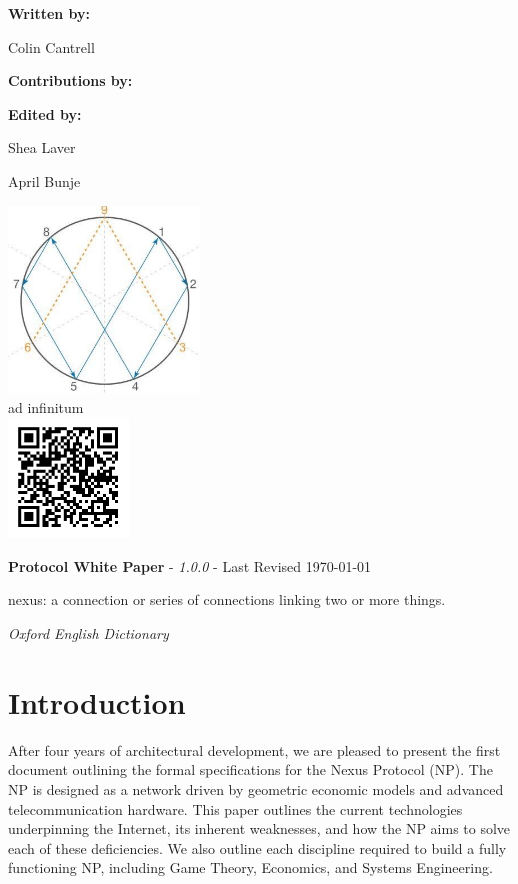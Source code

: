 \documentclass[11pt]{article}
\newcommand{\maketitlepage}[3]{
  \begingroup
  \centering
   
  \vspace*{2\baselineskip}
  
  \textbf{Written by:}\par
  \medskip
  Colin Cantrell\par

  \vspace*{2\baselineskip}

  \textbf{Contributions by:}\par\medskip
  \renewcommand\do[1]{%
    {
    \usevalue ##1:firstname \space \usevalue ##1:lastname \par}%
    }
  \docsvlist{#1}
  
  \vspace*{1.5\baselineskip}
  
  \textbf{Edited by:}\par
  Shea Laver \par
  April Bunje
  
  
  \vspace*{2\baselineskip}
  \includegraphics[width=0.38\textwidth]{./images/rsz_logo.png} \\
  \medskip
  ad infinitum \\
  
  \vspace*{1\baselineskip}
  \includegraphics[width=0.24\textwidth]{./images/rsz_npqr.png} \\
  \vspace*{3\baselineskip}
 

\pagebreak
\endgroup
}
\begin{document}
\title{\rmfamily{}}

\date {\usvardate {}}
\maketitle
\begin{abstract}
\bigskip


\noindent The Internet is one of the most important modern-day technologies, based on the Open Systems Interconnection (OSI) model with which there remains unresolved architectural limitations despite continued improvements.
Within this document, we outline a new architecture for the Internet that combines micro-satellites, phased array antennas, and software-defined routing to achieve a new degree of security and accessibility otherwise unobtainable under the OSI model used today.
These components are woven together throughout a global ecosystem that provides incentive for the growth of the network using economic models and game theory. 
Together they can replace the need for centralized Internet Service Providers (ISPs), limit censorship of free information, and give access to new services for users around the world.

\end{abstract}

\newpage

\tableofcontents
\newpage

\maketitlepage{Victor, BA, Hauk}
\newpage


\paragraph{\textbf{Protocol White Paper} - \textit{1.0.0} - Last Revised \today }

\epigraph{nexus: a connection or series of connections linking two or more things.}{\textit{\footnotesize{Oxford English Dictionary}}}


\section{Introduction}

After four years of architectural development, we are pleased to present the first document outlining the formal specifications for the Nexus Protocol (NP).
The NP is designed as a network driven by geometric economic models and advanced telecommunication hardware.
This paper outlines the current technologies underpinning the Internet, its inherent weaknesses, and how the NP aims to solve each of these deficiencies.
We also outline each discipline required to build a fully functioning NP, including Game Theory, Economics, and Systems Engineering.
\end{document}

